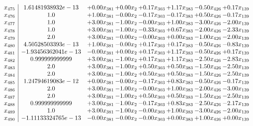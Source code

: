 \documentclass[8pt]{article}
\begin{document}
\[\begin{array}{c| c c@{\hskip 2pt} c@{\hskip 2pt} c@{\hskip 2pt} c@{\hskip 2pt} c@{\hskip 2pt} c@{\hskip 2pt} }
 x_{475}   &  1.61481938932e-13 & +  0.00 x_{381} & +  0.00 x_{2} & +  0.17 x_{303} & +  1.17 x_{383} & -0.50 x_{426} & +  0.17 x_{139}\\
 x_{476}   &  1.0 & +  1.00 x_{381} & -0.00 x_{2} & -0.17 x_{303} & -0.17 x_{383} & +  0.50 x_{426} & -0.17 x_{139}\\
 x_{477}   &  1.0 & +  3.00 x_{381} & -1.00 x_{2} & -0.00 x_{303} & +  1.00 x_{383} & -3.00 x_{426} & -2.00 x_{139}\\
 x_{478}   &  1.0 & +  3.00 x_{381} & -1.00 x_{2} & -0.33 x_{303} & +  0.67 x_{383} & -2.00 x_{426} & -2.33 x_{139}\\
 x_{479}   &  2.0 & +  3.00 x_{381} & -0.00 x_{2} & -0.00 x_{303} & +  0.00 x_{383} & -1.00 x_{426} & -2.00 x_{139}\\
 x_{480}   &  4.50528503393e-13 & +  1.00 x_{381} & -0.00 x_{2} & +  0.17 x_{303} & +  0.17 x_{383} & -0.50 x_{426} & -0.83 x_{139}\\
 x_{481}   &  -1.93456362041e-13 & -0.00 x_{381} & +  0.00 x_{2} & +  0.17 x_{303} & +  1.17 x_{383} & -0.50 x_{426} & +  0.17 x_{139}\\
 x_{482}   &  0.999999999999 & +  3.00 x_{381} & -1.00 x_{2} & +  0.17 x_{303} & +  1.17 x_{383} & -2.50 x_{426} & -2.83 x_{139}\\
 x_{483}   &  2.0 & +  3.00 x_{381} & -1.00 x_{2} & +  0.50 x_{303} & +  0.50 x_{383} & -1.50 x_{426} & -2.50 x_{139}\\
 x_{484}   &  2.0 & +  3.00 x_{381} & -1.00 x_{2} & +  0.50 x_{303} & +  0.50 x_{383} & -1.50 x_{426} & -2.50 x_{139}\\
 x_{485}   &  1.24794619083e-12 & +  0.00 x_{381} & -0.00 x_{2} & -0.17 x_{303} & +  0.83 x_{383} & -0.50 x_{426} & -0.17 x_{139}\\
 x_{486}   &  2.0 & +  3.00 x_{381} & -1.00 x_{2} & -0.00 x_{303} & +  1.00 x_{383} & -2.00 x_{426} & -3.00 x_{139}\\
 x_{487}   &  2.0 & +  3.00 x_{381} & -1.00 x_{2} & +  0.50 x_{303} & +  0.50 x_{383} & -1.50 x_{426} & -2.50 x_{139}\\
 x_{488}   &  0.999999999999 & +  3.00 x_{381} & -1.00 x_{2} & -0.17 x_{303} & +  0.83 x_{383} & -2.50 x_{426} & -2.17 x_{139}\\
 x_{489}   &  1.0 & +  3.00 x_{381} & -1.00 x_{2} & -0.00 x_{303} & +  1.00 x_{383} & -3.00 x_{426} & -2.00 x_{139}\\
 x_{490}   &  -1.11133324765e-13 & -0.00 x_{381} & -0.00 x_{2} & -0.00 x_{303} & +  0.00 x_{383} & +  1.00 x_{426} & +  0.00 x_{139}\\

\end{array}\]
\end{document}
